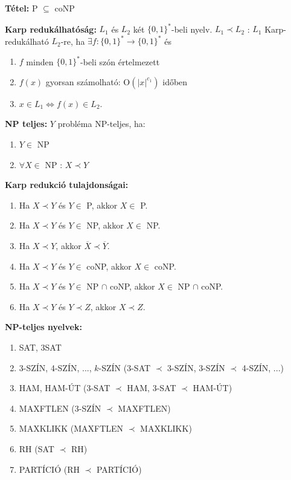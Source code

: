 \documentclass[a4paper]{article}
\begin{document}
\begin{tcolorbox}[size = fbox]
  \textbf{Tétel:} P $\subseteq$ coNP
\end{tcolorbox}

\begin{tcolorbox}[size = fbox]
  \textbf{Karp redukálhatóság:} $L_1$ és $L_2$ két $\{0,1\}^*$-beli nyelv. $L_1 \prec L_2$ : $L_1$ Karp-redukálható $L_2$-re, ha $\exists f: \{0,1\}^* \rightarrow \{0,1\}^*$ és
  \begin{enumerate}[label=(\roman*)]
    \item $f$ minden $\{0,1\}^*$-beli szón értelmezett
    \item $f(x)$ gyorsan számolható: O$(|x|^{c_1})$ időben
    \item $x \in L_1 \Longleftrightarrow f(x) \in L_2$.
  \end{enumerate}
\end{tcolorbox}

\begin{tcolorbox}[size = fbox]
  \textbf{NP teljes:} $Y$ probléma NP-teljes, ha:
  \begin{enumerate}[label=(\roman*)]
    \item $Y \in $ NP
    \item $\forall X \in$ NP : $X \prec Y$
  \end{enumerate}
\end{tcolorbox}

\begin{tcolorbox}[size = fbox]
  \textbf{Karp redukció tulajdonságai:}
  \begin{enumerate}[label=(\roman*)]
    \item Ha $X \prec Y$ és $Y \in $ P, akkor $X \in $ P.
    \item Ha $X \prec Y$ és $Y \in $ NP, akkor $X \in $ NP.
    \item Ha $X \prec Y$, akkor $\overline{X} \prec \overline{Y}$.
    \item Ha $X \prec Y$ és $Y \in $ coNP, akkor $X \in $ coNP.
    \item Ha $X \prec Y$ és $Y \in $ NP $\cap$ coNP, akkor $X \in $ NP $\cap$ coNP.
    \item Ha $X \prec Y$ és $Y \prec Z$, akkor $X \prec Z$.
  \end{enumerate}
\end{tcolorbox}

\begin{tcolorbox}[size = fbox]
  \textbf{NP-teljes nyelvek:}
  \begin{enumerate}[label=(\roman*)]
    \item SAT, 3SAT
    \item 3-SZÍN, 4-SZÍN, ..., $k$-SZÍN  (3-SAT $\prec$ 3-SZÍN, 3-SZÍN $\prec$ 4-SZÍN, ...) 
    \item HAM, HAM-ÚT (3-SAT $\prec$ HAM, 3-SAT $\prec$ HAM-ÚT)
    \item MAXFTLEN (3-SZÍN $\prec$ MAXFTLEN)
    \item MAXKLIKK (MAXFTLEN $\prec$ MAXKLIKK)
    \item RH (SAT $\prec$ RH)
    \item PARTÍCIÓ (RH $\prec$ PARTÍCIÓ)
  \end{enumerate}
\end{tcolorbox}
\end{document}
